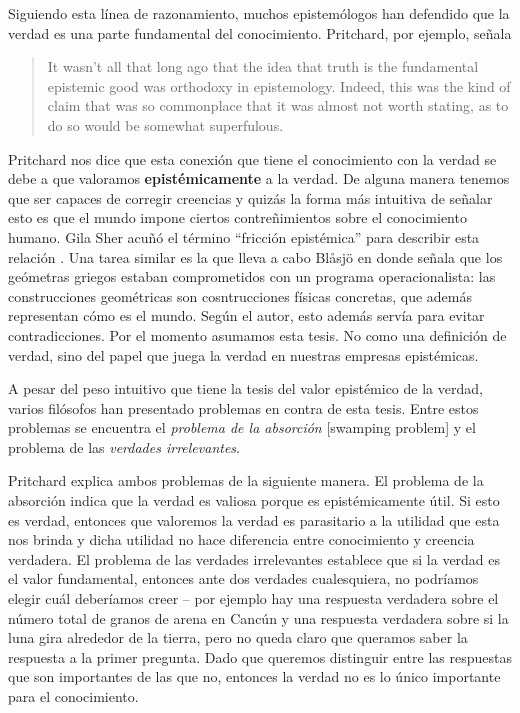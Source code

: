 \documentclass[12pt]{article}
\begin{document}
Siguiendo esta línea de razonamiento, muchos epistemólogos han defendido que la verdad es una parte fundamental del conocimiento. Pritchard, por ejemplo, señala  

\begin{quote}
It wasn’t all that long ago that the idea that truth is the fundamental epistemic good was orthodoxy in epistemology. Indeed, this was the kind of claim that was so commonplace that it was almost not worth stating, as to do so would be somewhat superfulous. \cite[p. 1]{Pritchard2021}
\end{quote}

Pritchard nos dice que esta conexión que tiene el conocimiento con la verdad se debe a que valoramos \textbf{epistémicamente} a la verdad. De alguna manera tenemos que ser capaces de corregir creencias y quizás la forma más intuitiva de señalar esto es que el mundo impone ciertos contreñimientos sobre el conocimiento humano. Gila Sher acuñó el término ``fricción epistémica'' para describir esta relación \citeyear{Sher2016}. Una tarea similar es la que lleva a cabo Blåsjö en \citeyear{Blaasjoe2022} donde señala que los geómetras griegos estaban comprometidos con un programa operacionalista: las construcciones geométricas son cosntrucciones físicas concretas, que además representan cómo es el mundo. Según el autor, esto además servía para evitar contradicciones. Por el momento asumamos esta tesis. No como una definición de verdad, sino del papel que juega la verdad en nuestras empresas epistémicas.

A pesar del peso intuitivo que tiene la tesis del valor epistémico de la verdad, varios filósofos han presentado problemas en contra de esta tesis. Entre estos problemas se encuentra el \textit{problema de la absorción} [swamping problem] y el problema de las \textit{verdades irrelevantes}. 

Pritchard explica ambos problemas de la siguiente manera. El problema de la absorción indica que la verdad es valiosa porque es epistémicamente útil. Si esto es verdad, entonces que valoremos la verdad es parasitario a la utilidad que esta nos brinda y dicha utilidad no hace diferencia entre conocimiento y creencia verdadera. El problema de las verdades irrelevantes establece que si la verdad es el valor fundamental, entonces ante dos verdades cualesquiera, no podríamos elegir cuál deberíamos creer -- por ejemplo hay una respuesta verdadera sobre el número total de granos de arena en Cancún y una respuesta verdadera sobre si la luna gira alrededor de la tierra, pero no queda claro que queramos saber la respuesta a la primer pregunta. Dado que queremos distinguir entre las respuestas que son importantes de las que no, entonces la verdad no es lo único importante para el conocimiento.
\end{document}
